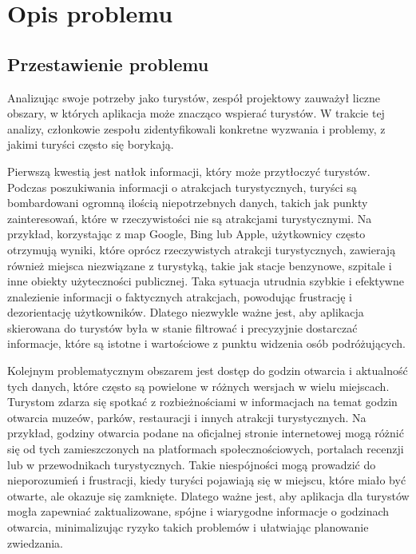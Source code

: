 
\chapter{Opis problemu}
\label{ch:opis-problemu}

\section{Przestawienie problemu}
\label{sec:przestawienie-problemu}

Analizując swoje potrzeby jako turystów, zespół projektowy zauważył liczne obszary, w których aplikacja może znacząco wspierać turystów.
W trakcie tej analizy, członkowie zespołu zidentyfikowali konkretne wyzwania i problemy, z jakimi turyści często się borykają.

Pierwszą kwestią jest natłok informacji, który może przytłoczyć turystów.
Podczas poszukiwania informacji o atrakcjach turystycznych, turyści są bombardowani ogromną ilością niepotrzebnych danych, takich jak punkty zainteresowań, które w rzeczywistości nie są atrakcjami turystycznymi.
Na przykład, korzystając z map Google, Bing lub Apple, użytkownicy często otrzymują wyniki, które oprócz rzeczywistych atrakcji turystycznych, zawierają również miejsca niezwiązane z turystyką, takie jak stacje benzynowe, szpitale i inne obiekty użyteczności publicznej.
Taka sytuacja utrudnia szybkie i efektywne znalezienie informacji o faktycznych atrakcjach, powodując frustrację i dezorientację użytkowników.
Dlatego niezwykle ważne jest, aby aplikacja skierowana do turystów była w stanie filtrować i precyzyjnie dostarczać informacje, które są istotne i wartościowe z punktu widzenia osób podróżujących.

Kolejnym problematycznym obszarem jest dostęp do godzin otwarcia i aktualność tych danych, które często są powielone w różnych wersjach w wielu miejscach.
Turystom zdarza się spotkać z rozbieżnościami w informacjach na temat godzin otwarcia muzeów, parków, restauracji i innych atrakcji turystycznych.
Na przykład, godziny otwarcia podane na oficjalnej stronie internetowej mogą różnić się od tych zamieszczonych na platformach społecznościowych, portalach recenzji lub w przewodnikach turystycznych.
Takie niespójności mogą prowadzić do nieporozumień i frustracji, kiedy turyści pojawiają się w miejscu, które miało być otwarte, ale okazuje się zamknięte.
Dlatego ważne jest, aby aplikacja dla turystów mogła zapewniać zaktualizowane, spójne i wiarygodne informacje o godzinach otwarcia, minimalizując ryzyko takich problemów i ułatwiając planowanie zwiedzania.

